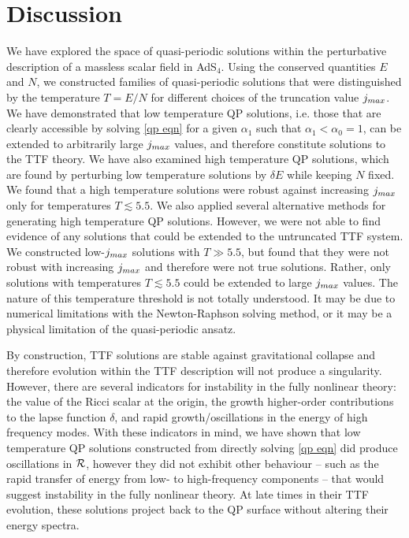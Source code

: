 \documentclass[../PhD.tex]{subfiles}
\begin{document}

\section{Discussion}
\label{sec: ttf discussion}

We have explored the space of quasi-periodic solutions within the perturbative description of a massless scalar field in AdS$_4$. Using the conserved quantities $E$ and $N$, we constructed families of quasi-periodic solutions that were distinguished by the temperature $T = E/N$ for different choices of the truncation value $j_{max}$. We have demonstrated that low temperature QP solutions, i.e. those that are clearly accessible by solving \eqref{qp eqn} for a given $\alpha_1$ such that $\alpha_1 < \alpha_0 = 1$, can be extended to arbitrarily large $j_{max}$ values, and therefore constitute solutions to the TTF theory. We have also examined high temperature QP solutions, which are found by perturbing low temperature solutions by $\delta E$ while keeping $N$ fixed. We found that a high temperature solutions were robust against increasing $j_{max}$ only for temperatures $T \lesssim 5.5$. We also applied several alternative methods for generating high temperature QP solutions. However, we were not able to find evidence of any solutions that could be extended to the untruncated TTF system. We constructed low-$j_{max}$ solutions with $T \gg 5.5$, but found that they were not robust with increasing $j_{max}$ and therefore were not true solutions. Rather, only solutions with temperatures $T \lesssim 5.5$ could be extended to large $j_{max}$ values. The nature of this temperature threshold is not totally understood. It may be due to numerical limitations with the Newton-Raphson solving method, or it may be a physical limitation of the quasi-periodic ansatz.

By construction, TTF solutions are stable against gravitational collapse and therefore evolution within the TTF description will not produce a singularity. However, there are several indicators for instability in the fully nonlinear theory: the value of the Ricci scalar at the origin, the growth higher-order contributions to the lapse function $\delta$, and rapid growth/oscillations in the energy of high frequency modes. With these indicators in mind, we have shown that low temperature QP solutions constructed from directly solving \eqref{qp eqn} did produce oscillations in $\mathcal R$, however they did not exhibit other behaviour -- such as the rapid transfer of energy from low- to high-frequency components -- that would suggest instability in the fully nonlinear theory. At late times in their TTF evolution, these solutions project back to the QP surface without altering their energy spectra. 
\end{document}
